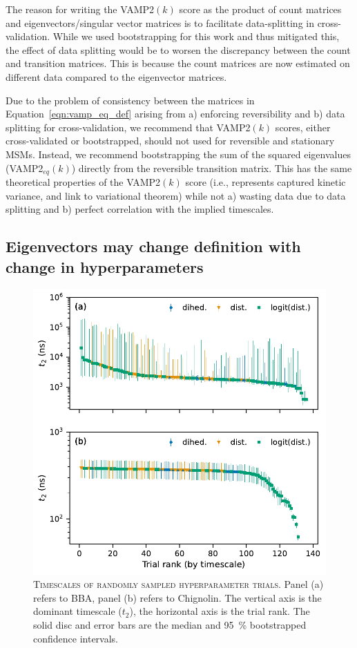 \documentclass[journal=jacsat,manuscript=article]{achemso}
\begin{document}
The reason for writing the VAMP2$(k)$ score as the product of count matrices and eigenvectors/singular vector matrices is to facilitate data-splitting in cross-validation. While we used bootstrapping for this work and thus mitigated this, the effect of data splitting would be to worsen the discrepancy between the count and transition matrices. This is because the count matrices are now estimated on different data compared to the eigenvector matrices.  

Due to the problem of consistency between the matrices in Equation~\ref{eqn:vamp_eq_def} arising from a) enforcing reversibility and b) data splitting for cross-validation,  we recommend that VAMP2$(k)$ scores, either cross-validated or bootstrapped, should not used for reversible and stationary MSMs. Instead, we recommend bootstrapping the sum of the squared eigenvalues (VAMP2$_{eq}(k)$) directly from the reversible transition matrix. This has the same theoretical properties of the VAMP2$(k)$ score (i.e., represents captured kinetic variance, and link to variational theorem) while not a) wasting data due to data splitting and b) perfect correlation with the implied timescales.

\FloatBarrier
\clearpage

\subsection{Eigenvectors may change definition with change in hyperparameters}

\begin{figure}[ht]
    \centering
    \includegraphics[width=0.7\columnwidth]{results1/timescale_distributions.pdf}
    \caption{\textsc{Timescales of randomly sampled hyperparameter trials.} Panel (a) refers to BBA, panel (b) refers to Chignolin. The vertical axis is the dominant timescale ($t_2$), the horizontal axis is the trial rank. The solid disc and error bars are the median and \SI{95}{\percent} bootstrapped confidence intervals.  }
    \label{fig:random_trials}
\end{figure}
\end{document}
